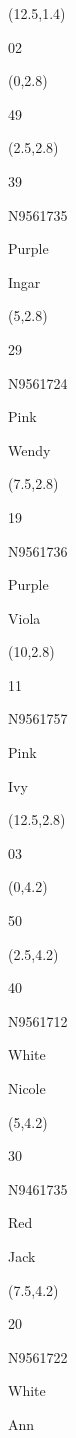 \documentclass[a4paper]{article}
\newcommand{\myseat}[4]{%
\vspace{-0.1cm}
\parbox[t][2.2cm][t]{3.5cm}{
\small #1 %
\begin{description}
\vspace{-0.1cm}
\item [ID:] #2
\vspace{-0.1cm}
\item [Team:] #3 \normalsize
\vspace{-0.1cm}
\item \normalsize #4
\vspace{-0.1cm}
\end{description}
}
}
\begin{document}
\begin{CJK}{UTF8}{cyberbit}
\begin{textblock}{2.5}(12.5,1.4)
\textblockcolor{}
	\myseat{02}{}{}{}
\end{textblock}

\begin{textblock}{2.5}(0,2.8)
\textblockcolor{}
	\myseat{49}{}{}{}
\end{textblock}

\begin{textblock}{2.5}(2.5,2.8)
	\myseat{39}{N9561735}{Purple}{Ingar}
\end{textblock}

\begin{textblock}{2.5}(5,2.8)
	\myseat{29}{N9561724}{Pink}{Wendy}
\end{textblock}

\begin{textblock}{2.5}(7.5,2.8)
	\myseat{19}{N9561736}{Purple}{Viola}
\end{textblock}

\begin{textblock}{2.5}(10,2.8)
	\myseat{11}{N9561757}{Pink}{Ivy}
\end{textblock}

\begin{textblock}{2.5}(12.5,2.8)
\textblockcolor{}
	\myseat{03}{}{}{}
\end{textblock}

\begin{textblock}{2.5}(0,4.2)
\textblockcolor{}
	\myseat{50}{}{}{}
\end{textblock}

\begin{textblock}{2.5}(2.5,4.2)
	\myseat{40}{N9561712}{White}{Nicole}
\end{textblock}

\begin{textblock}{2.5}(5,4.2)
	\myseat{30}{N9461735}{Red}{Jack}
\end{textblock}

\begin{textblock}{2.5}(7.5,4.2)
	\myseat{20}{N9561722}{White}{Ann}
\end{textblock}


\end{CJK}
\end{document}
